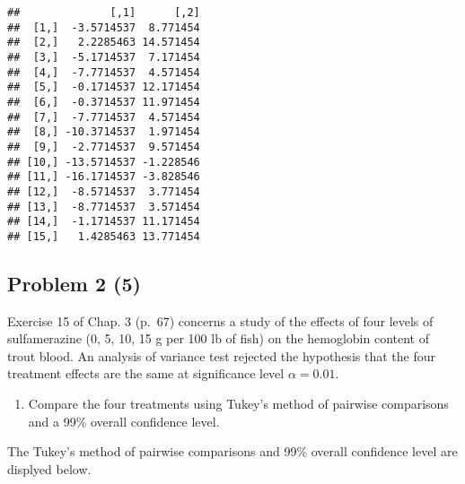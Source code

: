 \documentclass[12pt,]{article}
\providecommand{\tightlist}{%
  \setlength{\itemsep}{0pt}\setlength{\parskip}{0pt}}
\begin{document}
\begin{verbatim}
##              [,1]      [,2]
##  [1,]  -3.5714537  8.771454
##  [2,]   2.2285463 14.571454
##  [3,]  -5.1714537  7.171454
##  [4,]  -7.7714537  4.571454
##  [5,]  -0.1714537 12.171454
##  [6,]  -0.3714537 11.971454
##  [7,]  -7.7714537  4.571454
##  [8,] -10.3714537  1.971454
##  [9,]  -2.7714537  9.571454
## [10,] -13.5714537 -1.228546
## [11,] -16.1714537 -3.828546
## [12,]  -8.5714537  3.771454
## [13,]  -8.7714537  3.571454
## [14,]  -1.1714537 11.171454
## [15,]   1.4285463 13.771454
\end{verbatim}

\subsection{Problem 2 (5)}\label{problem-2-5}

Exercise 15 of Chap. 3 (p.~67) concerns a study of the effects of four
levels of sulfamerazine (0, 5, 10, 15 g per 100 lb of fish) on the
hemoglobin content of trout blood. An analysis of variance test rejected
the hypothesis that the four treatment effects are the same at
significance level \(\alpha=0.01\).

\begin{enumerate}
\def\labelenumi{(\alph{enumi})}
\tightlist
\item
  Compare the four treatments using Tukey's method of pairwise
  comparisons and a 99\% overall confidence level.
\end{enumerate}

The Tukey's method of pairwise comparisons and 99\% overall confidence
level are displyed below.
\end{document}
